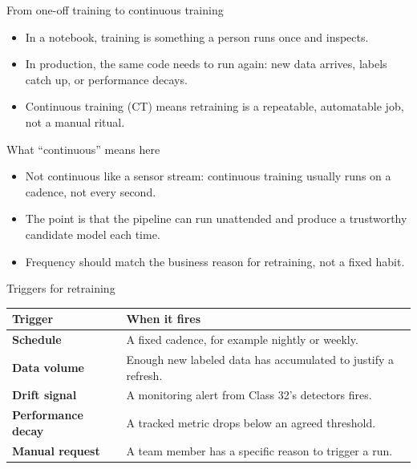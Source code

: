 \begin{frame}{From one-off training to continuous training}
\begin{itemize}
\item In a notebook, training is something a person runs once and inspects.
\item In production, the same code needs to run again: new data arrives, labels catch up, or performance decays.
\item Continuous training (CT) means retraining is a repeatable, automatable job, not a manual ritual.
\end{itemize}
\coursefooter
\end{frame}

\begin{frame}{What ``continuous'' means here}
\begin{itemize}
\item Not continuous like a sensor stream: continuous training usually runs on a cadence, not every second.
\item The point is that the pipeline can run unattended and produce a trustworthy candidate model each time.
\item Frequency should match the business reason for retraining, not a fixed habit.
\end{itemize}
\coursefooter
\end{frame}

\begin{frame}{Triggers for retraining}
\begin{tabularx}{\textwidth}{>{\bfseries}l X}
Trigger & When it fires \\
\toprule
Schedule & A fixed cadence, for example nightly or weekly. \\
Data volume & Enough new labeled data has accumulated to justify a refresh. \\
Drift signal & A monitoring alert from Class 32's detectors fires. \\
Performance decay & A tracked metric drops below an agreed threshold. \\
Manual request & A team member has a specific reason to trigger a run. \\
\bottomrule
\end{tabularx}
\coursefooter
\end{frame}

